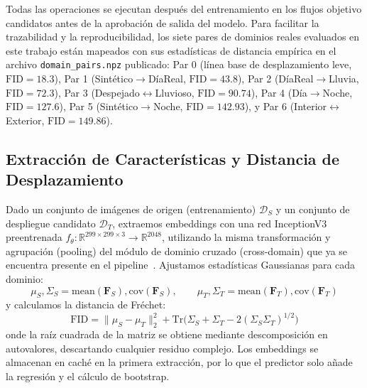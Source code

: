 \documentclass[10pt,twocolumn,letterpaper]{article}
\begin{document}
Todas las operaciones se ejecutan después del entrenamiento en los flujos objetivo candidatos antes de la aprobación de salida del modelo. Para facilitar la trazabilidad y la reproducibilidad, los siete pares de dominios reales evaluados en este trabajo están mapeados con sus estadísticas de distancia empírica en el archivo \texttt{domain\_pairs.npz} publicado: Par 0 (línea base de desplazamiento leve, $\text{FID}=18.3$), Par 1 (Sintético$\rightarrow$DíaReal, $\text{FID}=43.8$), Par 2 (DíaReal$\rightarrow$Lluvia, $\text{FID}=72.3$), Par 3 (Despejado$\leftrightarrow$Lluvioso, $\text{FID}=90.74$), Par 4 (Día$\rightarrow$Noche, $\text{FID}=127.6$), Par 5 (Sintético$\rightarrow$Noche, $\text{FID}=142.93$), y Par 6 (Interior$\leftrightarrow$Exterior, $\text{FID}=149.86$).

\subsection{Extracción de Características y Distancia de Desplazamiento}
Dado un conjunto de imágenes de origen (entrenamiento) $\mathcal{D}_S$ y un conjunto de despliegue candidato $\mathcal{D}_T$, extraemos embeddings con una red InceptionV3 preentrenada $f_\theta: \mathbb{R}^{299\times299\times3} \to \mathbb{R}^{2048}$, utilizando la misma transformación y agrupación (pooling) del módulo de dominio cruzado (cross-domain) que ya se encuentra presente en el pipeline~\cite{wyoloservice2}. Ajustamos estadísticas Gaussianas para cada dominio:
\begin{equation}
    \mu_S, \Sigma_S = \text{mean}(\mathbf{F}_S), \text{cov}(\mathbf{F}_S), \qquad
    \mu_T, \Sigma_T = \text{mean}(\mathbf{F}_T), \text{cov}(\mathbf{F}_T)
\end{equation}
y calculamos la distancia de Fr\'echet:
\begin{equation}
    \text{FID} = \|\mu_S - \mu_T\|_2^2 + \text{Tr}\big(\Sigma_S + \Sigma_T - 2(\Sigma_S\Sigma_T)^{1/2}\big)
\end{equation}
onde la raíz cuadrada de la matriz se obtiene mediante descomposición en autovalores, descartando cualquier residuo complejo. Los embeddings se almacenan en caché en la primera extracción, por lo que el predictor solo añade la regresión y el cálculo de bootstrap.
\end{document}
